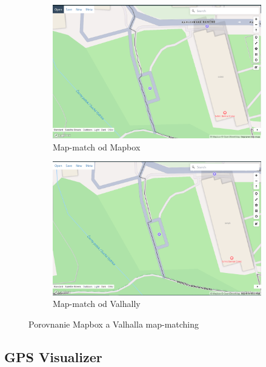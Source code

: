 \begin{figure}[H]
  \centering
  \begin{subfigure}{.45\textwidth}
    \centering
    \includegraphics[width=1\textwidth]{img/porovnanie_map_match/mapbox-map-match.png}
    \caption{Map-match od Mapbox}
    \label{fig:mapbox-map-match}
  \end{subfigure}
  \begin{subfigure}{.45\textwidth}
    \centering
    \includegraphics[width=1\textwidth]{img/porovnanie_map_match/valhalla-map-match.png}
    \caption{Map-match od Valhally}
    \label{fig:valhalla-map-match}
  \end{subfigure}
  \caption{Porovnanie Mapbox a Valhalla map-matching}
  \label{fig:mapbox-map-match-vs-valhalla}
\end{figure}

\subsection{GPS Visualizer}

